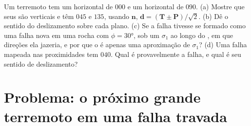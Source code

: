 \begin{exercise}[$\star\star\star$]\label{exo:b1:earthquake-source:12}
Um terremoto tem um  horizontal de  $000$ e um  horizontal de  $090$. (a) Mostre que seus  são verticais e têm  $045$ e $135$, usando $\mathbf n$, $\mathbf d = (\mathbf T \pm \mathbf P)/\sqrt2$. (b) Dê o sentido do deslizamento sobre cada plano. (c) Se a falha tivesse se formado como uma falha nova em uma rocha com $\phi = \ang{30}$, sob um $\sigma_1$ ao longo do , em que direções ela jazeria, e por que o  é apenas uma aproximação de $\sigma_1$? (d) Uma falha mapeada nas proximidades tem  $040$. Qual  é provavelmente a falha, e qual é seu sentido de deslizamento?
\end{exercise}

\section{Problema: o próximo grande terremoto em uma falha travada}


